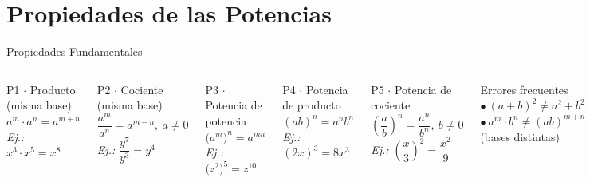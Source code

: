 \documentclass[12pt,aspectratio=169]{beamer}
\begin{document}
\section{Propiedades de las Potencias}

\begin{frame}{Propiedades Fundamentales}
  \begin{columns}[T]
    \begin{cprop}{P1 $\cdot$ Producto (misma base)}
      $a^{m}\cdot a^{n}=a^{m+n}$\quad
      \textit{Ej.:} $x^{3}\cdot x^{5}=x^{8}$
    \end{cprop}\vspace{4pt}
    \begin{cprop}{P2 $\cdot$ Cociente (misma base)}
      $\dfrac{a^{m}}{a^{n}}=a^{m-n},\ a\neq0$\quad
      \textit{Ej.:} $\dfrac{y^{7}}{y^{3}}=y^{4}$
    \end{cprop}\vspace{4pt}
    \begin{cprop}{P3 $\cdot$ Potencia de potencia}
      $\bigl(a^{m}\bigr)^{n}=a^{mn}$\quad
      \textit{Ej.:} $\bigl(z^{2}\bigr)^{5}=z^{10}$
    \end{cprop}

    \begin{cprop}{P4 $\cdot$ Potencia de producto}
      $(ab)^{n}=a^{n}b^{n}$\quad
      \textit{Ej.:} $(2x)^{3}=8x^{3}$
    \end{cprop}\vspace{4pt}
    \begin{cprop}{P5 $\cdot$ Potencia de cociente}
      $\left(\dfrac{a}{b}\right)^{n}=\dfrac{a^{n}}{b^{n}},\ b\neq0$\quad
      \textit{Ej.:} $\left(\dfrac{x}{3}\right)^{2}=\dfrac{x^{2}}{9}$
    \end{cprop}\vspace{4pt}
    \begin{calert}{Errores frecuentes}
      \small
      $\bullet\ (a+b)^{2}\neq a^{2}+b^{2}$\\
      $\bullet\ a^{m}\cdot b^{n}\neq(ab)^{m+n}$ (bases distintas)
    \end{calert}
  \end{columns}
\end{frame}
\end{document}
